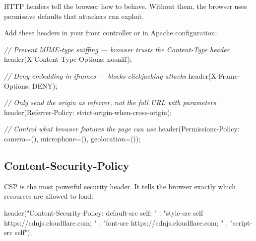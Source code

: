 \documentclass[11pt,a4paper,oneside]{book}
\newenvironment{Shaded}{\begin{snugshade}}{\end{snugshade}}
\newcommand{\StringTok}[1]{\textcolor[HTML]{4070A0}{#1}}
\newcommand{\CommentTok}[1]{\textcolor[HTML]{60A0B0}{\textit{#1}}}
\newcommand{\OtherTok}[1]{\textcolor[HTML]{007020}{#1}}
\newcommand{\FunctionTok}[1]{\textcolor[HTML]{06287E}{#1}}
\newcommand{\OperatorTok}[1]{\textcolor[HTML]{666666}{#1}}
\newcommand{\NormalTok}[1]{#1}
\begin{document}
HTTP headers tell the browser how to behave. Without them, the
browser uses permissive defaults that attackers can exploit.

Add these headers in your front controller or in Apache
configuration:

\begin{Shaded}
\begin{Highlighting}[]
\CommentTok{// Prevent MIME{-}type sniffing — browser trusts the Content{-}Type header}
\FunctionTok{header}\NormalTok{(}\StringTok{\textquotesingle{}X{-}Content{-}Type{-}Options: nosniff\textquotesingle{}}\NormalTok{)}\OtherTok{;}

\CommentTok{// Deny embedding in iframes — blocks clickjacking attacks}
\FunctionTok{header}\NormalTok{(}\StringTok{\textquotesingle{}X{-}Frame{-}Options: DENY\textquotesingle{}}\NormalTok{)}\OtherTok{;}

\CommentTok{// Only send the origin as referrer, not the full URL with parameters}
\FunctionTok{header}\NormalTok{(}\StringTok{\textquotesingle{}Referrer{-}Policy: strict{-}origin{-}when{-}cross{-}origin\textquotesingle{}}\NormalTok{)}\OtherTok{;}

\CommentTok{// Control what browser features the page can use}
\FunctionTok{header}\NormalTok{(}\StringTok{\textquotesingle{}Permissions{-}Policy: camera=(), microphone=(), geolocation=()\textquotesingle{}}\NormalTok{)}\OtherTok{;}
\end{Highlighting}
\end{Shaded}

\hypertarget{content-security-policy}{%
\subsection{Content-Security-Policy}\label{content-security-policy}}

CSP is the most powerful security header. It tells the browser
exactly which resources are allowed to load:

\begin{Shaded}
\begin{Highlighting}[]
\FunctionTok{header}\NormalTok{(}\StringTok{"Content{-}Security{-}Policy: default{-}src \textquotesingle{}self\textquotesingle{}; "}
     \OperatorTok{.} \StringTok{"style{-}src \textquotesingle{}self\textquotesingle{} https://cdnjs.cloudflare.com; "}
     \OperatorTok{.} \StringTok{"font{-}src https://cdnjs.cloudflare.com; "}
     \OperatorTok{.} \StringTok{"script{-}src \textquotesingle{}self\textquotesingle{}"}\NormalTok{)}\OtherTok{;}
\end{Highlighting}
\end{Shaded}
\end{document}
